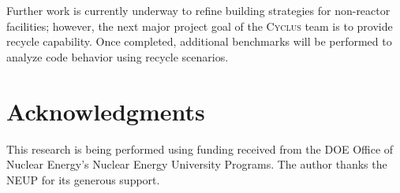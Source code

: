 \documentclass{anstrans}
\begin{document}
Further work is currently underway to refine building strategies for
non-reactor facilities; however, the next major project goal of the
\textsc{Cyclus} team is to provide recycle capability. Once completed,
additional benchmarks will be performed to analyze code behavior using
recycle scenarios.

\section{Acknowledgments}
This research is being performed using funding received from the DOE
Office of Nuclear Energy's Nuclear Energy University Programs.  The
author thanks the NEUP for its generous support.


\end{document}
